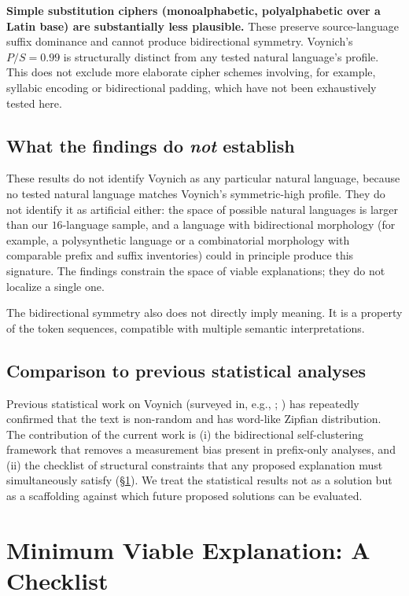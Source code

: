 \documentclass[11pt]{article}
\begin{document}
\textbf{Simple substitution ciphers (monoalphabetic, polyalphabetic over a
Latin base) are substantially less plausible.} These preserve source-language
suffix dominance and cannot produce bidirectional symmetry. Voynich's
$P/S = 0.99$ is structurally distinct from any tested natural language's
profile. This does not exclude more elaborate cipher schemes involving,
for example, syllabic encoding or bidirectional padding, which have not
been exhaustively tested here.

\subsection{What the findings do \emph{not} establish}

These results do not identify Voynich as any particular natural language,
because no tested natural language matches Voynich's symmetric-high profile.
They do not identify it as artificial either: the space of possible natural
languages is larger than our $16$-language sample, and a language with
bidirectional morphology (for example, a polysynthetic language or a
combinatorial morphology with comparable prefix and suffix inventories)
could in principle produce this signature. The findings constrain the space
of viable explanations; they do not localize a single one.

The bidirectional symmetry also does not directly imply meaning. It is a
property of the token sequences, compatible with multiple semantic
interpretations.

\subsection{Comparison to previous statistical analyses}

Previous statistical work on Voynich (surveyed in, e.g., \citealp{Bowern2021};
\citealp{Reddy2011}) has repeatedly confirmed that the text is non-random
and has word-like Zipfian distribution. The contribution of the current
work is (i) the bidirectional self-clustering framework that removes a
measurement bias present in prefix-only analyses, and (ii) the checklist
of structural constraints that any proposed explanation must simultaneously
satisfy (\S\ref{sec:mve}). We treat the statistical results not as a
solution but as a scaffolding against which future proposed solutions can
be evaluated.

\section{Minimum Viable Explanation: A Checklist}
\label{sec:mve}
\end{document}
